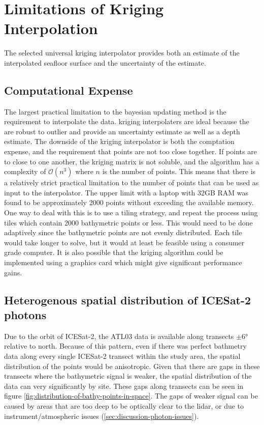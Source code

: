 \section{Limitations of Kriging Interpolation}

The selected universal kriging interpolator provides both an estimate of the interpolated seafloor surface and the uncertainty of the estimate.

\subsection{Computational Expense}

The largest practical limitation to the bayesian updating method is the requirement to interpolate the data. kriging interpolaters are ideal because the are robust to outlier and provide an uncertainty estimate as well as a depth estimate. The downside of the kriging interpolator is both the comptation expense, and the requirement that points are not too close together. If points are to close to one another, the kriging matrix is not soluble, and the algorithm has a complexity of $\mathcal{O}(n^3)$ where $n$ is the number of points. This means that there is a relatively strict practical limitation to the number of points that can be used as input to the interpolator. The upper limit with a laptop with 32GB RAM was found to be approximately 2000 points without exceeding the available memory. One way to deal with this is to use a tiling strategy, and repeat the process using tiles which contain 2000 bathymetric points or less. This would need to be done adaptively since the bathymetric points are not evenly distributed. Each tile would take longer to solve, but it would at least be feasible using a consumer grade computer. It is also possible that the kriging algorithm could be implemented using a graphics card which might give significant performance gains.

\subsection{Heterogenous spatial distribution of ICESat-2 photons}

Due to the orbit of ICESat-2, the ATL03 data is available along transects $\pm \ang{6}$ relative to north. Because of this pattern, even if there was perfect bathmetry data along every single ICESat-2 transect within the study area, the spatial distribution of the points would be anisotropic. Given that there are gaps in these transects where the bathymetric signal is weaker, the spatial distribution of the data can very significantly by site. These gaps along transects can be seen in figure \ref{fig:distribution-of-bathy-points-in-space}. The gaps of weaker signal can be caused by areas that are too deep to be optically clear to the lidar, or due to instrument/atmospheric issues (\ref{sec:discussion-photon-issues}). 

